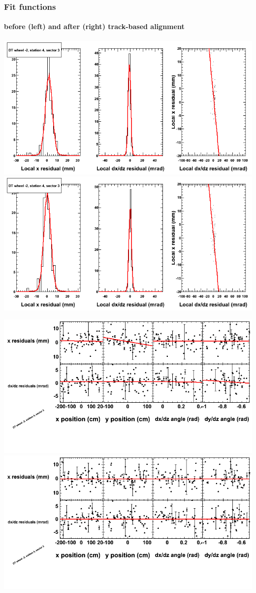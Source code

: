 \documentclass[compress]{beamer}
\begin{document}
\begin{frame}
\frametitle{Fit functions}
\framesubtitle{before (left) and after (right) track-based alignment}
\includegraphics[width=0.5\linewidth]{fitfunctions_re01/MBwhAst4sec03_bellcurves.png} \includegraphics[width=0.5\linewidth]{fitfunctions_re05/MBwhAst4sec03_bellcurves.png}

\includegraphics[width=0.5\linewidth]{fitfunctions_re01/MBwhAst4sec03_polynomials.png} \includegraphics[width=0.5\linewidth]{fitfunctions_re05/MBwhAst4sec03_polynomials.png}
\end{frame}
\end{document}
